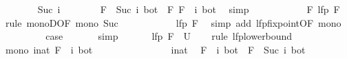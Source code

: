 \begin{isabellebody}
\ \ \ \ \ \ \isamarkupfalse%
\ {\isacharparenleft}Suc\ i{\isacharparenright}\isanewline
\ \ \ \ \ \ \isamarkupfalse%
\ {\isachardoublequoteopen}{\isacharparenleft}F\ {\isacharcircum}{\isacharcircum}\ Suc\ i{\isacharparenright}\ bot\ {\isacharequal}\ F\ {\isacharparenleft}{\isacharparenleft}F\ {\isacharcircum}{\isacharcircum}\ i{\isacharparenright}\ bot{\isacharparenright}{\isachardoublequoteclose}\ \isamarkupfalse%
\ simp\isanewline
\ \ \ \ \ \ \isamarkupfalse%
\ \isamarkupfalse%
\ {\isachardoublequoteopen}{\isasymdots}\ {\isasymle}\ F\ {\isacharparenleft}lfp\ F{\isacharparenright}{\isachardoublequoteclose}\ \isamarkupfalse%
\ {\isacharparenleft}rule\ monoD{\isacharbrackleft}OF\ mono\ Suc{\isacharbrackright}{\isacharparenright}\isanewline
\ \ \ \ \ \ \isamarkupfalse%
\ \isamarkupfalse%
\ {\isachardoublequoteopen}{\isasymdots}\ {\isacharequal}\ lfp\ F{\isachardoublequoteclose}\ \isamarkupfalse%
\ {\isacharparenleft}simp\ add{\isacharcolon}\ lfp{\isacharunderscore}fixpoint{\isacharbrackleft}OF\ mono{\isacharbrackright}{\isacharparenright}\isanewline
\ \ \ \ \ \ \isamarkupfalse%
\ \isamarkupfalse%
\ {\isacharquery}case\ \isacommand{{\isachardot}}\isamarkupfalse%
\isanewline
\ \ \ \ \isamarkupfalse%
\ simp\isanewline
\ \ \isamarkupfalse%
\isanewline
\ \ \isamarkupfalse%
\ {\isachardoublequoteopen}lfp\ F\ {\isasymle}\ {\isacharquery}U{\isachardoublequoteclose}\isanewline
\ \ \isamarkupfalse%
\ {\isacharparenleft}rule\ lfp{\isacharunderscore}lowerbound{\isacharparenright}\isanewline
\ \ \ \ \isamarkupfalse%
\ {\isachardoublequoteopen}mono\ {\isacharparenleft}{\isasymlambda}i{\isacharcolon}{\isacharcolon}nat{\isachardot}\ {\isacharparenleft}F\ {\isacharcircum}{\isacharcircum}\ i{\isacharparenright}\ bot{\isacharparenright}{\isachardoublequoteclose}\isanewline
\ \ \ \ \isamarkupfalse%
\ {\isacharminus}\isanewline
\ \ \ \ \ \ \isacommand{{\isacharbraceleft}}\isamarkupfalse%
\ \isamarkupfalse%
\ i{\isacharcolon}{\isacharcolon}nat\ \isamarkupfalse%
\ {\isachardoublequoteopen}{\isacharparenleft}F\ {\isacharcircum}{\isacharcircum}\ i{\isacharparenright}\ bot\ {\isasymle}\ {\isacharparenleft}F\ {\isacharcircum}{\isacharcircum}\ {\isacharparenleft}Suc\ i{\isacharparenright}{\isacharparenright}\ bot{\isachardoublequoteclose}\isanewline
\ \ \ \ \ \ \ \ \isamarkupfalse%

\end{isabellebody}
